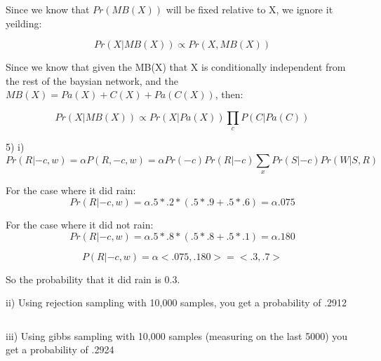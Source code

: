 \documentclass[12pt]{article}
\begin{document}
Since we know that $Pr(MB(X))$ will be fixed relative to X, we ignore it yeilding: 

\begin{equation}
    Pr(X|MB(X)) \propto Pr(X,MB(X))
\end{equation}

Since we know that given the MB(X) that X is conditionally independent from the rest of 
the baysian network, and the $MB(X) = Pa(X) + C(X) + Pa(C(X))$, then: 

\begin{equation}
    Pr(X|MB(X)) \propto Pr(X|Pa(X))\prod_c P(C|Pa(C))
\end{equation}


\pagebreak
\setcounter{equation}{0}
5)
i) \begin{equation}
  Pr(R|-c,w) = \alpha P(R,-c,w)=\alpha Pr(-c)Pr(R|-c)\sum_x Pr(S|-c) Pr(W|S,R)
\end{equation}

For the case where it did rain: 
\begin{equation}
  Pr(R|-c,w) = \alpha .5*.2*(.5*.9+.5*.6) = \alpha .075
\end{equation}

For the case where it did not rain: 
\begin{equation}
  Pr(R|-c,w) = \alpha .5*.8*(.5*.8+.5*.1) = \alpha .180
\end{equation}

\begin{equation}
P(R|-c,w) =  \alpha<.075,.180> = <.3,.7>
\end{equation}

So the probability that it did rain is 0.3.

ii) Using rejection sampling with 10,000 samples, you get a probability of 
.2912

{\scriptsize \inputminted{python}{rejection_sampling.py} }

iii) Using gibbs sampling with 10,000 samples (measuring on the last 5000) you get a probability of 
.2924

{\scriptsize \inputminted{python}{gibbs.py} }
\end{document}
